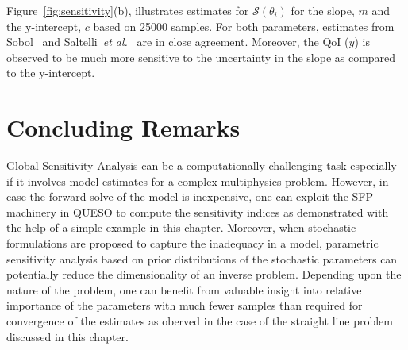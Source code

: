 Figure~\ref{fig:sensitivity}(b), illustrates estimates for $\mathcal{S}(\theta_{i})$ for the slope, $m$ and the
y-intercept, $c$ based on 25000 samples. For both parameters, estimates from Sobol~\cite{Sobol:1990} and 
Saltelli~\emph{et al.}~\cite{Saltelli:2010} are in close agreement. Moreover, the QoI ($y$) is observed
to be much more sensitive to the uncertainty in the slope as compared to the y-intercept. 

\section{Concluding Remarks}

Global Sensitivity Analysis can be a computationally challenging task especially  if it involves model
estimates for a complex multiphysics problem. However, in case the forward solve of the model is inexpensive, one
can exploit the SFP machinery in QUESO to compute the sensitivity indices as demonstrated with the
help of a simple example in this chapter. Moreover, when stochastic formulations are proposed to
capture the inadequacy in a model, parametric sensitivity analysis based on prior distributions of
the stochastic parameters can potentially reduce the dimensionality of an inverse problem.
Depending upon the nature of the problem, one can benefit from valuable insight into relative
importance of the parameters with much fewer samples than required for convergence of the estimates as
oberved in the case of the straight line problem discussed in this chapter.  
 




















